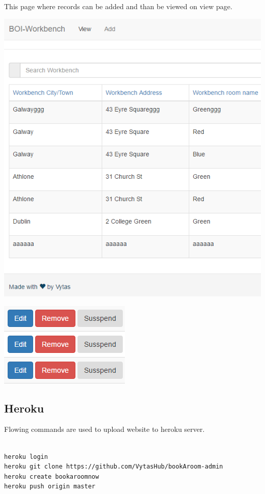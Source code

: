 \begin{itemize}
\pagebreak
This page where records can be added and than be viewed on view page.
\begin{center}    
	\includegraphics{img/AdminView.png}
\end{center}
\begin{center}    
	\includegraphics{img/AddDelete.png}
\end{center}

\subsection{Heroku}
Flowing commands are used to upload website to heroku server.
\begin{verbatim}

heroku login
heroku git clone https://github.com/VytasHub/bookAroom-admin
heroku create bookaroomnow
heroku push origin master



\end{verbatim}
\end{itemize}

